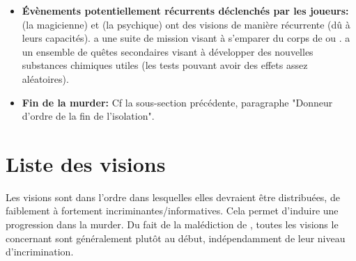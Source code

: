 {\begin{itemize}
		\par Le problème vient de l'algorithme de comptage des personnes, qui tient compte des doublons et quintuplons. De plus, \nmPlayerX n'est pas identifié comme étant humain (suite à toutes les mutations présents dans son corps). Ainsi, uniquement 6 parts de gâteaux (sans épice = une moitié de gâteau) seront distribuées, alors qu'il y a 12 personnes physiquement à bord.
		
		\par Si interrogée, l'IA insistera qu'il y a uniquement "Six personnes à bord, bande de gourmands! Et que le second service ne viendra qu'une fois que vous aurez fini vos parts". Le comptage est fait en "regroupant tous les signes de vie perçu par tous les capteurs dispersés dans la zone, gardant que ceux qui sont humains (afin d'éliminer tout ce qui est insecte et animal) et compter le nombre de différences". 
		
		\par Le gâteau a originellement 12 parts, 6 parts sont distribuées au début, mais 6 autres peuvent. Les personnes mangeant leur part de gâteau auront une vision quelques minutes après (au grand désespoir de l'inspecteur).
		
		
		\item \textbf{Évènements potentiellement récurrents déclenchés par les joueurs:} \nmPlayerVI (la magicienne) et \nmPlayerIX (la psychique) ont des visions de manière récurrente (dû à leurs capacités). \nmPlayerI a une suite de mission visant à s'emparer du corps de \nmPlayerII ou \nmPlayerIII. \nmPlayerXII a un ensemble de quêtes secondaires visant à développer des nouvelles substances chimiques utiles (les tests pouvant avoir des effets assez aléatoires).
		
		\item \textbf{Fin de la murder:} Cf la sous-section précédente, paragraphe "Donneur d'ordre de la fin de l'isolation".
	\end{itemize}
	
	
	\section{Liste des visions}
	
	\par Les visions sont dans l'ordre dans lesquelles elles devraient être distribuées, de faiblement à fortement incriminantes/informatives. Cela permet d'induire une progression dans la murder. Du fait de la malédiction de \nmPlayerXI, toutes les visions le concernant sont généralement plutôt au début, indépendamment de leur niveau d'incrimination.
	
}
